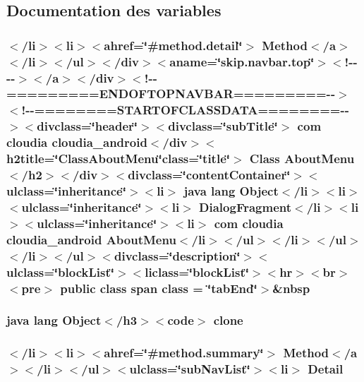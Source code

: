 \subsection{Documentation des variables}
\hypertarget{_about_menu_8html_aca81297e9b19a2d3e274a36c182486be}{
\subsubsection[{class}]{\setlength{\rightskip}{0pt plus 5cm}$<$/li$>$$<$li$>$$<$ahref=\char`\"{}\#method.\-detail\char`\"{}$>$ Method$<$/{\bf a}$>$$<$/li$>$$<$/ul$>$$<$/div$>$$<$aname=\char`\"{}skip.\-navbar.\-top\char`\"{}$>$$<$!-\/-\/-\/-\/$>$$<$/a$>$$<$/div$>$$<$!-\/-\/=========E\-N\-D\-O\-F\-T\-O\-P\-N\-A\-V\-B\-A\-R=========-\/-\/$>$$<$!-\/-\/========S\-T\-A\-R\-T\-O\-F\-C\-L\-A\-S\-S\-D\-A\-T\-A========-\/-\/$>$$<$divclass=\char`\"{}header\char`\"{}$>$$<$divclass=\char`\"{}sub\-Title\char`\"{}$>$ com cloudia cloudia\-\_\-android$<$/div$>$$<$h2title=\char`\"{}Class\-About\-Menu\char`\"{}class=\char`\"{}title\char`\"{}$>$ Class {\bf About\-Menu}$<$/h2$>$$<$/div$>$$<$divclass=\char`\"{}content\-Container\char`\"{}$>$$<$ulclass=\char`\"{}inheritance\char`\"{}$>$$<$li$>$ java lang Object$<$/li$>$$<$li$>$$<$ulclass=\char`\"{}inheritance\char`\"{}$>$$<$li$>$ Dialog\-Fragment$<$/li$>$$<$li$>$$<$ulclass=\char`\"{}inheritance\char`\"{}$>$$<$li$>$ com cloudia cloudia\-\_\-android {\bf About\-Menu}$<$/li$>$$<$/ul$>$$<$/li$>$$<$/ul$>$$<$/li$>$$<$/ul$>$$<$divclass=\char`\"{}description\char`\"{}$>$$<$ulclass=\char`\"{}block\-List\char`\"{}$>$$<$liclass=\char`\"{}block\-List\char`\"{}$>$$<$hr$>$$<$br$>$$<$pre$>$ public class {\bf span} class = \char`\"{}tab\-End\char`\"{}$>$\&nbsp}}\label{_about_menu_8html_aca81297e9b19a2d3e274a36c182486be}
\hypertarget{_about_menu_8html_adc9607fcabf6f2d7f401ad52015ef6e0}{
\subsubsection[{clone}]{\setlength{\rightskip}{0pt plus 5cm}java lang Object$<$/h3$>$$<$code$>$ clone}}\label{_about_menu_8html_adc9607fcabf6f2d7f401ad52015ef6e0}
\hypertarget{_about_menu_8html_a1e04b5ec07bcd5281e26dcd40e5b3a94}{
\subsubsection[{Detail}]{\setlength{\rightskip}{0pt plus 5cm}$<$/li$>$$<$li$>$$<$ahref=\char`\"{}\#method.\-summary\char`\"{}$>$ Method$<$/{\bf a}$>$$<$/li$>$$<$/ul$>$$<$ulclass=\char`\"{}sub\-Nav\-List\char`\"{}$>$$<$li$>$ Detail}}\label{_about_menu_8html_a1e04b5ec07bcd5281e26dcd40e5b3a94}
